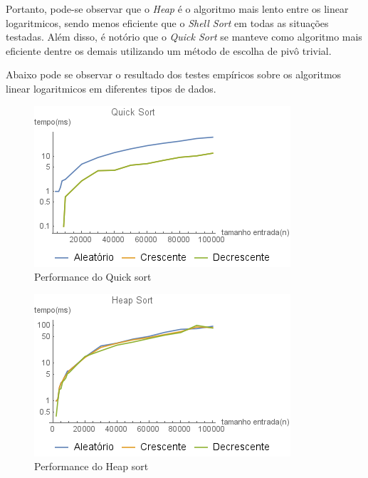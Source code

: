 \documentclass[a4paper, 12pt]{report}
\begin{document}
Portanto, pode-se observar que o \emph{Heap} é o algoritmo mais lento entre os
linear logaritmicos, sendo menos eficiente que o \emph{Shell Sort} em todas as
situações testadas. Além disso, é notório que o \emph{Quick Sort} se manteve como
algoritmo mais eficiente dentre os demais utilizando um método de escolha de
pivô trivial.

Abaixo pode se observar o resultado dos testes empíricos sobre os algoritmos
linear logaritmicos em diferentes tipos de dados.

\begin{figure}[htb]
\centering
\includegraphics[width=.9\linewidth]{./img/quick_all.png}
\caption{Performance do Quick sort}
\end{figure}

\begin{figure}[htb]
\centering
\includegraphics[width=.9\linewidth]{./img/heap_all.png}
\caption{Performance do Heap sort}
\end{figure}
\end{document}
